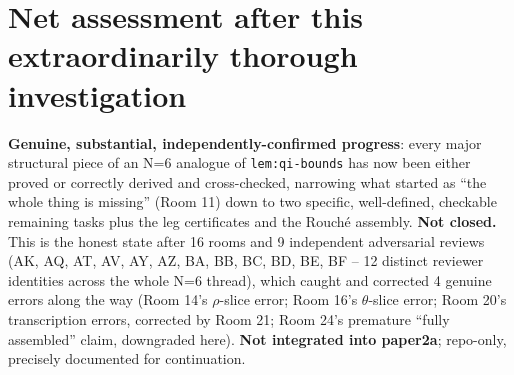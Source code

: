 \documentclass[11pt]{article}
\begin{document}
\section*{Net assessment after this extraordinarily thorough investigation}
\textbf{Genuine, substantial, independently-confirmed progress}: every major structural piece of
an N=6 analogue of \texttt{lem:qi-bounds} has now been either proved or correctly derived and
cross-checked, narrowing what started as ``the whole thing is missing'' (Room 11) down to two
specific, well-defined, checkable remaining tasks plus the leg certificates and the Rouch\'e
assembly. \textbf{Not closed.} This is the honest state after 16 rooms and 9 independent
adversarial reviews (AK, AQ, AT, AV, AY, AZ, BA, BB, BC, BD, BE, BF -- 12 distinct reviewer
identities across the whole N=6 thread), which caught and corrected 4 genuine errors along the way
(Room 14's $\rho$-slice error; Room 16's $\theta$-slice error; Room 20's transcription errors,
corrected by Room 21; Room 24's premature ``fully assembled'' claim, downgraded here). \textbf{Not
integrated into paper2a}; repo-only, precisely documented for continuation.
\end{document}
